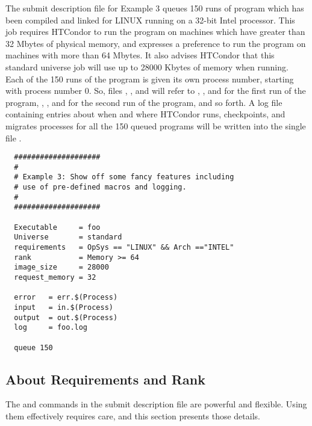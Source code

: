 The submit description file for Example 3 queues 150
runs of program  which has been compiled and linked for
LINUX running on a 32-bit Intel processor.
This job requires HTCondor to run the program on machines which have
greater than 32 Mbytes of physical memory, and expresses a
preference to run the program on machines with more than 64 Mbytes.
It also advises HTCondor that this standard universe job will
use up to 28000 Kbytes of memory when running.
Each of the 150 runs of the program is given its own process number,
starting with process number 0.
So, files 
, , and  will
refer to , , and  for the first run
of the program,
, ,
and  for the second run of the program, and so forth.
A log file containing entries
about when and where HTCondor runs, checkpoints, and migrates processes for
all the 150 queued programs
will be written into the single file .
\begin{verbatim}
  ####################                    
  #
  # Example 3: Show off some fancy features including
  # use of pre-defined macros and logging.
  #
  ####################                                                    

  Executable     = foo                                                    
  Universe       = standard                                                    
  requirements   = OpSys == "LINUX" && Arch =="INTEL"     
  rank           = Memory >= 64
  image_size     = 28000
  request_memory = 32

  error   = err.$(Process)                                                
  input   = in.$(Process)                                                 
  output  = out.$(Process)                                                
  log     = foo.log

  queue 150
\end{verbatim}


\subsection{\label{sec:user-man-req-and-rank}About Requirements and Rank}

The 
 and  commands in the submit description file
are powerful and flexible. 
Using them effectively requires care, and this section presents
those details.

